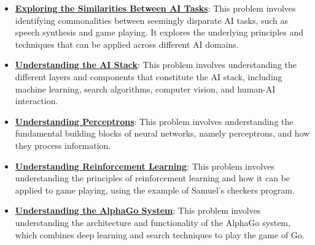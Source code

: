 \documentclass{article}%
\begin{document}
\begin{itemize}[leftmargin=*]
\item \href{https://purdue.brightspace.com/d2l/common/assets/pdfjs-d2l-dist/1.0.14-legacy/web/viewer.html?file=%2Fcontent%2Fenforced%2F1095467-wl.202510.CS.24300.001%2F02L2-Intro.pdf%3Fou%3D1095467&lang=en-us&container=d2l-fileviewer-rendered-pdf&fullscreen=d2l-fileviewer-rendered-pdf-dialog&height=667#page=31}{\textbf{Exploring the Similarities Between AI Tasks}}: This problem involves identifying commonalities between seemingly disparate AI tasks, such as speech synthesis and game playing. It explores the underlying principles and techniques that can be applied across different AI domains.%
\item \href{https://purdue.brightspace.com/d2l/common/assets/pdfjs-d2l-dist/1.0.14-legacy/web/viewer.html?file=%2Fcontent%2Fenforced%2F1095467-wl.202510.CS.24300.001%2F02L2-Intro.pdf%3Fou%3D1095467&lang=en-us&container=d2l-fileviewer-rendered-pdf&fullscreen=d2l-fileviewer-rendered-pdf-dialog&height=667#page=44}{\textbf{Understanding the AI Stack}}: This problem involves understanding the different layers and components that constitute the AI stack, including machine learning, search algorithms, computer vision, and human-AI interaction.%
\item \href{https://purdue.brightspace.com/d2l/common/assets/pdfjs-d2l-dist/1.0.14-legacy/web/viewer.html?file=%2Fcontent%2Fenforced%2F1095467-wl.202510.CS.24300.001%2F02L2-Intro.pdf%3Fou%3D1095467&lang=en-us&container=d2l-fileviewer-rendered-pdf&fullscreen=d2l-fileviewer-rendered-pdf-dialog&height=667#page=45}{\textbf{Understanding Perceptrons}}: This problem involves understanding the fundamental building blocks of neural networks, namely perceptrons, and how they process information.%
\item \href{https://purdue.brightspace.com/d2l/common/assets/pdfjs-d2l-dist/1.0.14-legacy/web/viewer.html?file=%2Fcontent%2Fenforced%2F1095467-wl.202510.CS.24300.001%2F02L2-Intro.pdf%3Fou%3D1095467&lang=en-us&container=d2l-fileviewer-rendered-pdf&fullscreen=d2l-fileviewer-rendered-pdf-dialog&height=667#page=46}{\textbf{Understanding Reinforcement Learning}}: This problem involves understanding the principles of reinforcement learning and how it can be applied to game playing, using the example of Samuel's checkers program.%
\item \href{https://purdue.brightspace.com/d2l/common/assets/pdfjs-d2l-dist/1.0.14-legacy/web/viewer.html?file=%2Fcontent%2Fenforced%2F1095467-wl.202510.CS.24300.001%2F02L2-Intro.pdf%3Fou%3D1095467&lang=en-us&container=d2l-fileviewer-rendered-pdf&fullscreen=d2l-fileviewer-rendered-pdf-dialog&height=667#page=50}{\textbf{Understanding the AlphaGo System}}: This problem involves understanding the architecture and functionality of the AlphaGo system, which combines deep learning and search techniques to play the game of Go.%
\end{itemize}%
\end{document}
